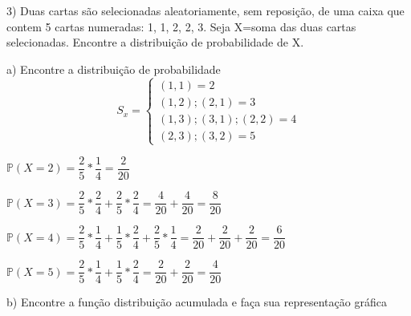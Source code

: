 \documentclass[12pt,a4paper]{article}
\begin{document}
\vspace{1cm}
3) Duas cartas são selecionadas aleatoriamente, sem reposição, de uma caixa que contem 5 cartas numeradas: 1, 1, 2, 2, 3. Seja X=soma das duas cartas selecionadas. Encontre a distribuição de probabilidade de X.

a) Encontre a distribuição de probabilidade
\[
S_{x} =
\begin{cases}
(1,1) = 2 \\
(1,2);(2,1) = 3\\
(1,3);(3,1);(2,2) = 4\\
(2,3);(3,2) = 5
\end{cases}
\]
\begin{center}
	\vspace{0.5cm}
	$\mathbb{P}(X=2) = \dfrac{2}{5}*\dfrac{1}{4} = \dfrac{2}{20}$
	
	\vspace{0.5cm}
	$\mathbb{P}(X=3) = \dfrac{2}{5}*\dfrac{2}{4}+\dfrac{2}{5}*\dfrac{2}{4} = \dfrac{4}{20} + \dfrac{4}{20} = \dfrac{8}{20}$
	
	\vspace{0.5cm}
	$\mathbb{P}(X=4) = \dfrac{2}{5}*\dfrac{1}{4}+\dfrac{1}{5}*\dfrac{2}{4}+\dfrac{2}{5}*\dfrac{1}{4} = \dfrac{2}{20} + \dfrac{2}{20} + \dfrac{2}{20} = \dfrac{6}{20}$
	
	\vspace{0.5cm}
	$\mathbb{P}(X=5) = \dfrac{2}{5}*\dfrac{1}{4}+\dfrac{1}{5}*\dfrac{2}{4} = \dfrac{2}{20} + \dfrac{2}{20} = \dfrac{4}{20}$
\end{center}

\vspace{1cm}
b) Encontre a função distribuição acumulada e faça sua 
representação gráfica
\end{document}
